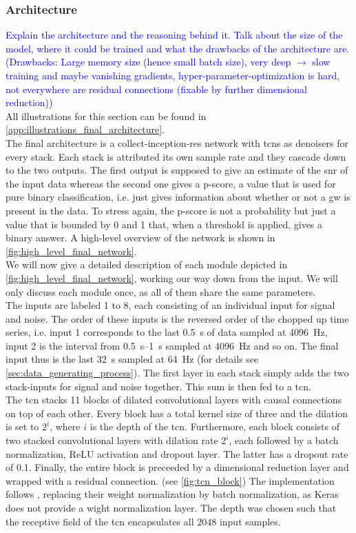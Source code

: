 \subsubsection{Architecture}\label{sec:final_architecture}
\textcolor{blue}{Explain the architecture and the reasoning behind it. Talk about the size of the model, where it could be trained and what the drawbacks of the architecture are. (Drawbacks: Large memory size (hence small batch size), very deep $\to$ slow training and maybe vanishing gradients, hyper-parameter-optimization is hard, not everywhere are residual connections (fixable by further dimensional reduction))}\\
All illustrations for this section can be found in \autoref{app:illustrations_final_architecture}.\\
The final architecture is a collect-inception-res network with \gls{tcn}s as denoisers for every stack. Each stack is attributed its own sample rate and they cascade down to the two outputs. The first output is supposed to give an estimate of the \gls{snr} of the input data whereas the second one gives a p-score, a value that is used for pure binary classification, i.e. just gives information about whether or not a \gls{gw} is present in the data. To stress again, the p-score is not a probability but just a value that is bounded by 0 and 1 that, when a threshold is applied, gives a binary answer. A high-level overview of the network is shown in \autoref{fig:high_level_final_network}.\\
We will now give a detailed description of each module depicted in \autoref{fig:high_level_final_network}, working our way down from the input. We will only discuss each module once, as all of them share the same parameters.\\
The inputs are labeled 1 to 8, each consisting of an individual input for signal and noise. The order of these inputs is the reversed order of the chopped up time series, i.e. input 1 corresponds to the last \SI{0.5}{\s} of data sampled at \SI{4096}{\hertz}, input 2 is the interval from \SIrange{0.5}{1}{\s} sampled at \SI{4096}{\hertz} and so on. The final input thus is the last \SI{32}{\s} sampled at \SI{64}{\hertz} (for details see \autoref{sec:data_generating_process}). The first layer in each stack simply adds the two stack-inputs for signal and noise together. This sum is then fed to a \gls{tcn}.\\
The \gls{tcn} stacks 11 blocks of dilated convolutional layers with causal connections on top of each other. Every block has a total kernel size of three and the dilation is set to $2^i$, where $i$ is the depth of the \gls{tcn}. Furthermore, each block consists of two stacked convolutional layers with dilation rate $2^i$, each followed by a  batch normalization, ReLU activation and dropout layer. The latter has a dropout rate of 0.1. Finally, the entire block is preceeded by a dimensional reduction layer and wrapped with a residual connection. (see \autoref{fig:tcn_block}) The implementation follows \cite{tcn_paper}, replacing their weight normalization by batch normalization, as Keras does not provide a wight normalization layer. The depth was chosen such that the receptive field of the \gls{tcn} encapsulates all $2048$ input samples.\\
